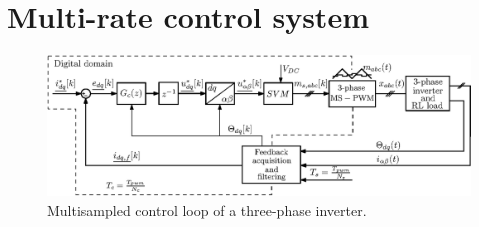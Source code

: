 \documentclass[journal]{IEEEtran}
\begin{document}
 
\section{Multi-rate control system}

\begin{figure}[t!]
    \centerline{\includegraphics[width=0.95\linewidth]{figures/schematic.eps}}
    \caption{Multisampled control loop of a three-phase inverter.}
    \label{fig:MSControl}
\end{figure}
\end{document}
